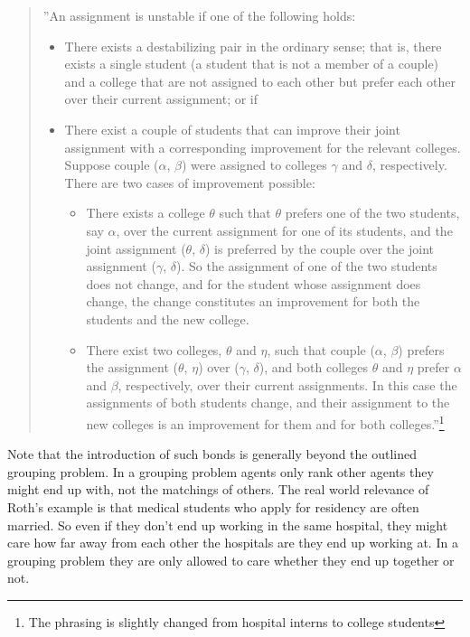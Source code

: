 \documentclass{elsarticle}
\begin{document}
\begin{quotation}

''An assignment is unstable if one of the following holds:
\begin{itemize}
\item[1] There exists a destabilizing pair in the ordinary sense; that is, there exists a single student (a student that is not a member of a couple) and a college that are not assigned to each other but prefer each other over their current assignment; or if 

\item[2] There exist a couple of students that can improve their joint assignment with a corresponding improvement for the relevant colleges. Suppose couple ($\alpha$, $\beta$) were assigned to colleges $\gamma$ and $\delta$, respectively. There are two cases of improvement possible: 


\begin{itemize}
\item[(a)] There exists a college $\theta$ such that $\theta$ prefers one of the two students, say $\alpha$, over the current assignment for one of its students, and the joint assignment ($\theta$, $\delta$) is preferred by the couple over the joint assignment ($\gamma$, $\delta$). So the assignment of one of the two students does not change, and for the student whose assignment does change, the change constitutes an improvement for both the students and the new college.
\item[(b)] There exist two colleges, $\theta$ and $\eta$, such that couple ($\alpha$, $\beta$) prefers the assignment ($\theta$, $\eta$) over ($\gamma$, $\delta$), and both colleges $\theta$ and $\eta$ prefer $\alpha$ and $\beta$, respectively, over their current assignments. In this case the assignments of both students change, and their assignment to the new colleges is an improvement for them and for both colleges.''\citep[pp. 288-289]{ronn90}\footnote{The phrasing is slightly changed from hospital interns to college students}

\end{itemize}

\end{itemize}
\end{quotation}


Note that the introduction of such bonds is generally beyond the outlined grouping problem. In a grouping problem agents only rank other agents they might end up with, not the matchings of others. The real world relevance of Roth's example is that medical students who apply for residency are often married. So even if they don't end up working in the same hospital, they might care how far away from each other the hospitals are they end up working at. In a grouping problem they are only allowed to care whether they end up together or not.
\end{document}
